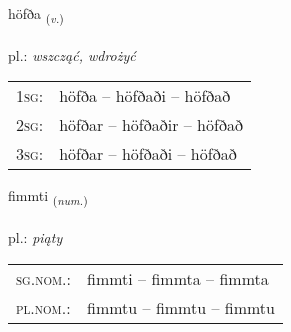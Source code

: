 \documentclass[frontgrid, backgrid]{flacards}\usepackage[]{graphicx}\usepackage[]{xcolor}
\begin{document}
\renewcommand{\flhead}{\vskip5pt \fboxsep=0pt {\small\bfseries\footnotesize Sagnorð | Verb}}
\renewcommand{\fcfoot}{\vskip5pt \fboxsep=0pt \hspace{2pt}{\small\bfseries\footnotesize 2K}}

\renewcommand{\blhead}{\vskip5pt {\small\bfseries\footnotesize Sagnorð | Verb }}
\renewcommand{\bcfoot}{\vskip5pt \hspace{2pt}{\small\bfseries\footnotesize 2K}}


{höfða \small{\textsubscript{(\textit{v.})}} \\[1ex] %
\textphonetic{[hœvða]} \\
pl.: \emph{wszcząć, wdrożyć} \\  [2ex]
\renewcommand*{\arraystretch}{0.8}
\begin{tabular}{p{1cm}l}
\textsc{1sg}: & höfða -- höfðaði -- höfðað \\ 
\textsc{2sg}: & höfðar -- höfðaðir -- höfðað \\ 
\textsc{3sg}: & höfðar -- höfðaði -- höfðað \\ 
\end{tabular}
}

\renewcommand{\flhead}{\vskip5pt \fboxsep=0pt {\small\bfseries\footnotesize Töluorð | Numeral}}
\renewcommand{\fcfoot}{\vskip5pt \fboxsep=0pt \hspace{2pt}{\small\bfseries\footnotesize 2K}}

\renewcommand{\blhead}{\vskip5pt {\small\bfseries\footnotesize Töluorð | Numeral }}
\renewcommand{\bcfoot}{\vskip5pt \hspace{2pt}{\small\bfseries\footnotesize 2K}}


{fimmti \small{\textsubscript{(\textit{num.})}} \\[1ex] %
\textphonetic{[fɪm̥tɪ]} \\
pl.: \emph{piąty} \\  [2ex]
\renewcommand*{\arraystretch}{0.8}
\begin{tabular}{ll}
\textsc{sg.nom.}: & fimmti  --  fimmta -- fimmta \\ 
\textsc{pl.nom.}: & fimmtu -- fimmtu -- fimmtu
\end{tabular}
}
\end{document}
